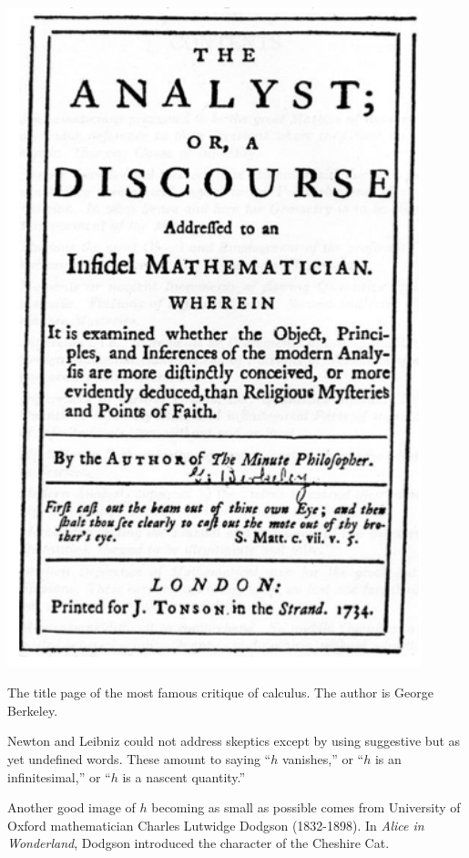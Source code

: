 \documentclass[
  letterpaper,
  DIV=11,
  numbers=noendperiod,
  oneside]{scrreprt}
\begin{document}
\begin{marginfigure}

{\centering \includegraphics[width=0.9\textwidth,height=\textheight]{Differentiation/www/the_analyst_title_page.png}

}

\caption{\label{fig-analysis}The title page of the most famous critique
of calculus. The author is George Berkeley.}

\end{marginfigure}

Newton and Leibniz could not address skeptics except by using suggestive
but as yet undefined words. These amount to saying ``\(h\) vanishes,''
or ``\(h\) is an infinitesimal,'' or ``\(h\) is a nascent quantity.''

Another good image of \(h\) becoming as small as possible comes from
University of Oxford mathematician Charles Lutwidge Dodgson (1832-1898).
In \emph{Alice in Wonderland}, Dodgson introduced the character of the
Cheshire Cat.
\end{document}
